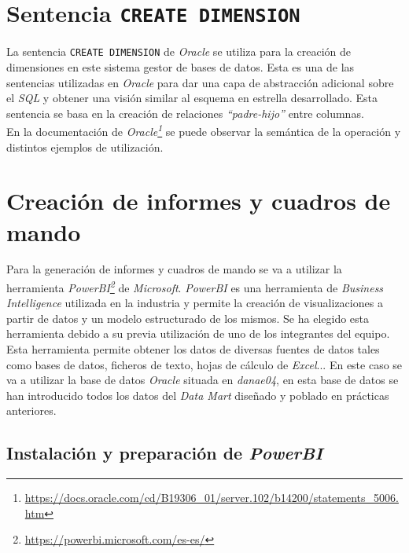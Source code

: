 \documentclass{article}
\begin{document}
\section{Sentencia \texttt{CREATE DIMENSION}}

La sentencia \texttt{CREATE DIMENSION} de \textit{Oracle} se utiliza para la creación de dimensiones en este sistema gestor de bases de datos. Esta es una de las sentencias utilizadas en \textit{Oracle} para dar una capa de abstracción adicional sobre el \textit{SQL} y obtener una visión similar al esquema en estrella desarrollado. Esta sentencia se basa en la creación de relaciones \textit{``padre-hijo''} entre columnas.\\
En la documentación de \textit{Oracle\footnote{\url{https://docs.oracle.com/cd/B19306_01/server.102/b14200/statements_5006.htm}}} se puede observar la semántica de la operación y distintos ejemplos de utilización.\\


\newpage
\section{Creación de informes y cuadros de mando}

Para la generación de informes y cuadros de mando se va a utilizar la herramienta \textit{PowerBI\footnote{\url{https://powerbi.microsoft.com/es-es/}}} de \textit{Microsoft}. \textit{PowerBI} es una herramienta de \textit{Business Intelligence} utilizada en la industria y permite la creación de visualizaciones a partir de datos y un modelo estructurado de los mismos. Se ha elegido esta herramienta debido a su previa utilización de uno de los integrantes del equipo.\\
Esta herramienta permite obtener los datos de diversas fuentes de datos tales como bases de datos, ficheros de texto, hojas de cálculo de \textit{Excel}... En este caso se va a utilizar la base de datos \textit{Oracle} situada en \textit{danae04}, en esta base de datos se han introducido todos los datos del \textit{Data Mart} diseñado y poblado en prácticas anteriores.\\


\subsection{Instalación y preparación de \textit{PowerBI}}
\end{document}

